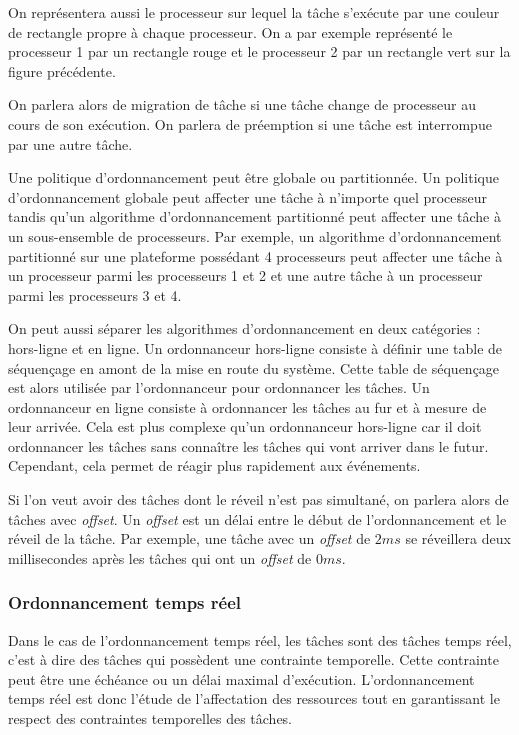On représentera aussi le processeur sur lequel la tâche s'exécute par une couleur de rectangle propre à chaque processeur. On a par exemple représenté le processeur 1 par un rectangle rouge et le processeur 2 par un rectangle vert sur la figure précédente.

On parlera alors de migration de tâche si une tâche change de processeur au cours de son exécution. On parlera de préemption si une tâche est interrompue par une autre tâche.

Une politique d'ordonnancement peut être globale ou partitionnée. Un politique d'ordonnancement globale peut affecter une tâche à n'importe quel processeur tandis qu'un algorithme d'ordonnancement partitionné peut affecter une tâche à un sous-ensemble de processeurs. Par exemple, un algorithme d'ordonnancement partitionné sur une plateforme possédant 4 processeurs peut affecter une tâche à un processeur parmi les processeurs 1 et 2 et une autre tâche à un processeur parmi les processeurs 3 et 4. 

On peut aussi séparer les algorithmes d'ordonnancement en deux catégories : hors-ligne et en ligne. Un ordonnanceur hors-ligne consiste à définir une table de séquençage en amont de la mise en route du système. Cette table de séquençage est alors utilisée par l'ordonnanceur pour ordonnancer les tâches. Un ordonnanceur en ligne consiste à ordonnancer les tâches au fur et à mesure de leur arrivée. Cela est plus complexe qu'un ordonnanceur hors-ligne car il doit ordonnancer les tâches sans connaître les tâches qui vont arriver dans le futur. Cependant, cela permet de réagir plus rapidement aux événements.


Si l'on veut avoir des tâches dont le réveil n'est pas simultané, on parlera alors de tâches avec \textit{offset}. Un \textit{offset} est un délai entre le début de l'ordonnancement et le réveil de la tâche. Par exemple, une tâche avec un \textit{offset} de $2 ms$ se réveillera deux millisecondes après les tâches qui ont un \textit{offset} de $0 ms$.




\subsubsection{Ordonnancement temps réel}
Dans le cas de l'ordonnancement temps réel, les tâches sont des tâches temps réel, c'est à dire des tâches qui possèdent une contrainte temporelle. Cette contrainte peut être une échéance ou un délai maximal d'exécution. L'ordonnancement temps réel est donc l'étude de l'affectation des ressources tout en garantissant le respect des contraintes temporelles des tâches. 

